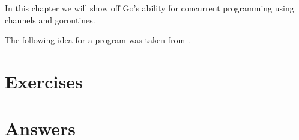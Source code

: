 \noindent{}In this chapter we will show off Go's ability for
concurrent programming using channels and goroutines.

The following idea for a program was taken from \cite{curso_go}.




\section{Exercises}




\cleardoublepage
\section{Answers}
\shipoutAnswer
